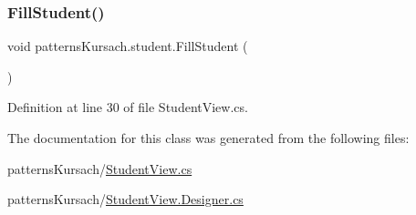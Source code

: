 \subsubsection{\texorpdfstring{Fill\+Student()}{FillStudent()}}
{\footnotesize\ttfamily void patterns\+Kursach.\+student.\+Fill\+Student (\begin{DoxyParamCaption}{ }\end{DoxyParamCaption})}



Definition at line 30 of file Student\+View.\+cs.



The documentation for this class was generated from the following files\+:\begin{DoxyCompactItemize}
\item 
patterns\+Kursach/\mbox{\hyperlink{_student_view_8cs}{Student\+View.\+cs}}\item 
patterns\+Kursach/\mbox{\hyperlink{_student_view_8_designer_8cs}{Student\+View.\+Designer.\+cs}}\end{DoxyCompactItemize}
